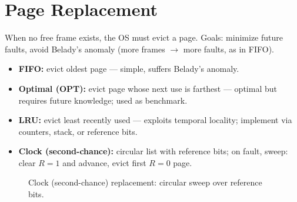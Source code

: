 \section{Page Replacement}
\label{sec:replacement}

When no free frame exists, the OS must evict a page. Goals: minimize future
faults, avoid Belady's anomaly (more frames $\to$ more faults, as in FIFO).

\begin{itemize}
  \item \textbf{FIFO:} evict oldest page --- simple, suffers Belady's anomaly.
  \item \textbf{Optimal (OPT):} evict page whose next use is farthest --- optimal
        but requires future knowledge; used as benchmark.
  \item \textbf{LRU:} evict least recently used --- exploits temporal locality;
        implement via counters, stack, or reference bits.
  \item \textbf{Clock (second-chance):} circular list with reference bits;
        on fault, sweep: clear $R=1$ and advance, evict first $R=0$ page.
\end{itemize}

\begin{figure}[h!]
\centering
{}
\caption{Clock (second-chance) replacement: circular sweep over reference bits.}
\label{fig:clock}
\end{figure}

